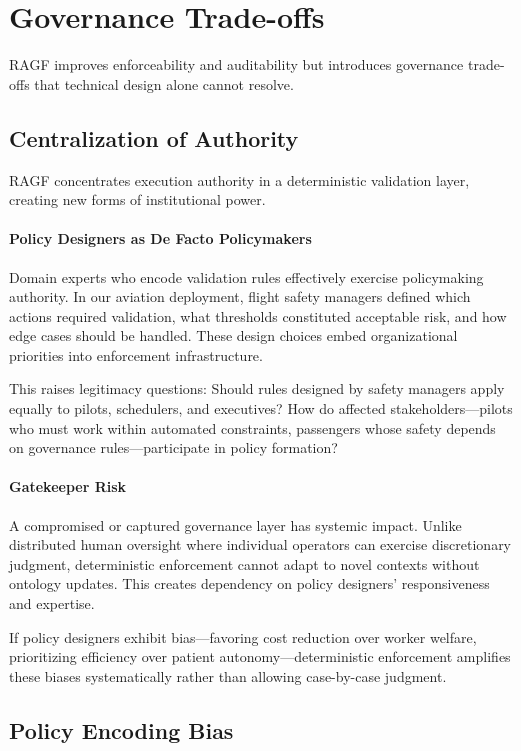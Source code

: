 \documentclass[sigconf,nonacm]{acmart}
\begin{document}
\section{Governance Trade-offs}
\label{sec:tradeoffs}

RAGF improves enforceability and auditability but introduces governance trade-offs that technical design alone cannot resolve.

\subsection{Centralization of Authority}

RAGF concentrates execution authority in a deterministic validation layer, creating new forms of institutional power.

\paragraph{Policy Designers as De Facto Policymakers} Domain experts who encode validation rules effectively exercise policymaking authority. In our aviation deployment, flight safety managers defined which actions required validation, what thresholds constituted acceptable risk, and how edge cases should be handled. These design choices embed organizational priorities into enforcement infrastructure.

This raises legitimacy questions: Should rules designed by safety managers apply equally to pilots, schedulers, and executives? How do affected stakeholders---pilots who must work within automated constraints, passengers whose safety depends on governance rules---participate in policy formation?

\paragraph{Gatekeeper Risk} A compromised or captured governance layer has systemic impact. Unlike distributed human oversight where individual operators can exercise discretionary judgment, deterministic enforcement cannot adapt to novel contexts without ontology updates. This creates dependency on policy designers' responsiveness and expertise.

If policy designers exhibit bias---favoring cost reduction over worker welfare, prioritizing efficiency over patient autonomy---deterministic enforcement amplifies these biases systematically rather than allowing case-by-case judgment.

\subsection{Policy Encoding Bias}
\end{document}
